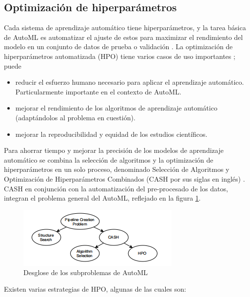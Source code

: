 \subsection{Optimización de hiperparámetros}
Cada sistema de aprendizaje automático tiene hiperparámetros, y la tarea básica de AutoML es automatizar el ajuste de estos para maximizar el rendimiento del modelo en un conjunto de datos de prueba o validación \citep{hastie2009elements}. La optimización de hiperparámetros automatizada (HPO) tiene varios casos de uso importantes \citep{hutter2019automated}; puede
\begin{itemize}
	\item reducir el esfuerzo humano necesario para aplicar el aprendizaje automático. Particularmente importante en el contexto de AutoML.
	\item mejorar el rendimiento de los algoritmos de aprendizaje automático (adaptándolos al problema en cuestión).
	\item mejorar la reproducibilidad y equidad de los estudios científicos.
\end{itemize}
Para ahorrar tiempo y mejorar la precisión de los modelos de aprendizaje automático se combina la selección de algoritmos y la optimización de hiperparámetros en un solo proceso, denominado Selección de Algoritmos y Optimización de Hiperparámetros Combinados (CASH por sus siglas en inglés) \citep{tuggener2019automated}. \\
CASH en conjunción con la automatización del pre-procesado de los datos, integran el problema general del AutoML, reflejado en la figura \ref{fig:desglose-de-los-subproblemas-de-automl}. 
\begin{figure}[H]
	\centering
	\includegraphics[width=0.6\linewidth]{"figuras/capi 1/Desglose de los subproblemas de AutoML"}
	\caption{Desglose de los subproblemas de AutoML \citep{zoller2021benchmark}}
	\label{fig:desglose-de-los-subproblemas-de-automl}
\end{figure} 
Existen varias estrategias de HPO, algunas de las cuales son:

